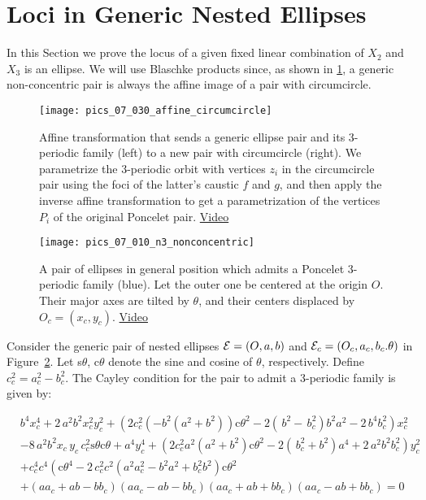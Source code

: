 \section{Loci in Generic Nested Ellipses}
\label{sec:07-loci}

 In this Section we prove the locus of a given fixed linear combination of $X_2$ and $X_3$ is an ellipse. We will use Blaschke products since, as shown in \cref{fig:07-affine}, a generic non-concentric pair is always the affine image of a pair with circumcircle.
 
 \begin{figure}
    \centering
    \texttt{[image: pics\_07\_030\_affine\_circumcircle]}
    \caption{Affine transformation that sends a generic ellipse pair and its 3-periodic family (left) to a new pair with circumcircle (right). We parametrize the 3-periodic orbit with vertices $z_i$ in the circumcircle pair using the foci of the latter's caustic $f$ and $g$, and then apply the inverse affine transformation to get a parametrization of the vertices $P_i$ of the original Poncelet pair. \href{https://youtu.be/6xSFBLWIkTM}{Video}}
    \label{fig:07-affine}
\end{figure}

\begin{figure}
    \centering
    \texttt{[image: pics\_07\_010\_n3\_nonconcentric]}
    \caption{A pair of ellipses in general position which admits a Poncelet 3-periodic family (blue). Let the outer one be centered at the origin $O$. Their major axes are tilted by $\theta$, and their centers displaced by $O_c=(x_c,y_c)$. \href{https://youtu.be/bjHpXVyXXVc}{Video}}
    \label{fig:07-n3-nonconcentric}
\end{figure}

Consider the generic pair of nested ellipses $\mathcal{E}=(O,a,b)$ and $\mathcal{E}_c=(O_c,a_c,b_c.\theta)$ in Figure~\ref{fig:07-n3-nonconcentric}. Let s$\theta$, c$\theta$ denote the sine and cosine of $\theta$, respectively. Define $c_c^2=a_c^2-b_c^2$. The Cayley condition for the pair to admit a 3-periodic family is given by:

{\small
\begin{align}
&{b}^{4}x_c^{4}+2\,{a}^{2}{b}^{2}x_c^{2}y_c^{2}+
 \left(  2 c_c^2  \left( -{b}^{2}({a}^{2}+{b}^{2} )\right)  \text{c}\theta^2  - 2\left(  \,b ^{2}- \,b_c
^{2} \right) {b}^{2}{a}^{2}-2\,{b}^{4}b_c^{2} \right)x_c
^{2} \label{eqn:cayley}\\
&-8\,{a}^{2}{b}^{2}x_c\,{  y_c}\,c_c^2 
\text{s}\theta\text{c}\theta  +{a}^{4}y_c^{4} + \left(  2 c_c^2 a^2 \left(
{a}^{2}+{b}^{2}  \right)\text{c}\theta^2  
 -2 \left(  \,b_c^{2}+{b}^{2} \right) {a}^{4}+2
\,{a}^{2}{b}^{2}b_c^{2} \right) y_c^{2} \nonumber\\
&+ c_c^4  c^4  \left( \text{c}\theta^4-2\, c_c^2 c^2
  \left( {a}^{2} a_c^{2}-{b}^{2}{a}^{2}+
b_c^{2}{b}^{2} \right) \text{c}\theta^2 \right. \nonumber\\
 &+ \left( a a_c+a b-b b_c \right)  \left( a a_c
-a b -b b_c \right)  \left( a a_c+a b+b b_c \right)  \left( a
a_c-a b+b b_c \right) = 0\nonumber
\end{align}
}


